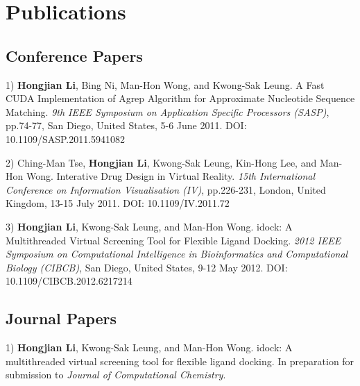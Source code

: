 \chapter{Publications}

\section{Conference Papers}

1) \textbf{Hongjian Li}, Bing Ni, Man-Hon Wong, and Kwong-Sak Leung. A Fast CUDA Implementation of Agrep Algorithm for Approximate Nucleotide Sequence Matching. \textit{9th IEEE Symposium on Application Specific Processors (SASP)}, pp.74-77, San Diego, United States, 5-6 June 2011. DOI: 10.1109/SASP.2011.5941082

2) Ching-Man Tse, \textbf{Hongjian Li}, Kwong-Sak Leung, Kin-Hong Lee, and Man-Hon Wong. Interative Drug Design in Virtual Reality. \textit{15th International Conference on Information Visualisation (IV)}, pp.226-231, London, United Kingdom, 13-15 July 2011. DOI: 10.1109/IV.2011.72

3) \textbf{Hongjian Li}, Kwong-Sak Leung, and Man-Hon Wong. idock: A Multithreaded Virtual Screening Tool for Flexible Ligand Docking. \textit{2012 IEEE Symposium on Computational Intelligence in Bioinformatics and Computational Biology (CIBCB)}, San Diego, United States, 9-12 May 2012. DOI: 10.1109/CIBCB.2012.6217214

\section{Journal Papers}

1) \textbf{Hongjian Li}, Kwong-Sak Leung, and Man-Hon Wong. idock: A multithreaded virtual screening tool for flexible ligand docking. In preparation for submission to \textit{Journal of Computational Chemistry}.

\chapterend
